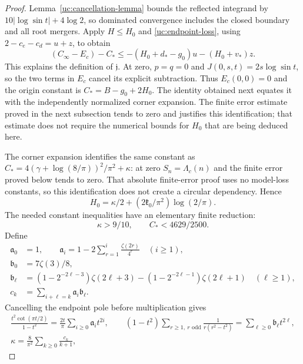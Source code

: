 \begin{proof}
Lemma~\ref{uc:cancellation-lemma} bounds the reflected integrand by
$10|\log\sin t|+4\log2$, so dominated convergence includes the
closed boundary and all root mergers. Apply $H\leq H_0$ and
\eqref{uc:endpoint-loss}, using $2-c_e-c_d=u+z$, to obtain
\[
 (C_\infty-E_c)-C_*
 \leq-(H_0+d_*-g_0)u-(H_0+v_*)z.
\]
This explains the definition of $\mathfrak{j}$. At zero, $p=q=0$ and
$J(0,s,t)=2s\log\sin t$, so the two terms in $E_c$ cancel its
explicit subtraction. Thus $E_c(0,0)=0$ and the origin constant is
$C_*=B-g_0+2H_0$. The identity obtained next equates it with the
independently normalized corner expansion. The finite error estimate
proved in the next subsection tends to zero and justifies this
identification; that estimate does not require the numerical bounds
for $H_0$ that are being deduced here.

The corner expansion identifies the same constant as
$C_*=4(\gamma+\log(8/\pi))^2/\pi^2+\kappa$:
at zero $S_n=\Lambda_c(n)$ and the finite error proved below tends
to zero. That absolute finite-error proof uses no model-loss constants,
so this identification does not create a circular dependency. Hence
\begin{equation}\label{uc:origin-identity}
 H_0=\kappa/2+(2\mathfrak{k}_0/\pi^2)\log(2/\pi).
\end{equation}
The needed constant inequalities have an elementary finite reduction:
\begin{equation}\label{uc:coarse-input}
 \kappa>9/10,\qquad C_*<4629/2500.
\end{equation}
Define
\begin{align*}
 \mathfrak a_0&=1,\qquad
 \mathfrak a_i=1-2\sum_{r=1}^i\frac{\zeta(2r)}{4^r}\quad(i\geq1),\\
 \mathfrak b_0&=7\zeta(3)/8,\\
 \mathfrak b_\ell&=(1-2^{-2\ell-3})\zeta(2\ell+3)
              -(1-2^{-2\ell-1})\zeta(2\ell+1)\quad(\ell\geq1),\\
 c_k&=\sum_{i+\ell=k}\mathfrak a_i\mathfrak b_\ell.
\end{align*}
Cancelling the endpoint pole before multiplication gives
\begin{equation}\label{uc:kappa-series}
 \begin{gathered}
 \frac{t^2\cot(\pi t/2)}{1-t^2}
       =\frac{2t}\pi\sum_{i\geq0}\mathfrak a_it^{2i},\qquad
 (1-t^2)\sum_{r\geq1,\ r\text{ odd}}
       \frac1{r(r^2-t^2)}=\sum_{\ell\geq0}\mathfrak b_\ell t^{2\ell},\\
 \kappa=\frac8{\pi^2}\sum_{k\geq0}\frac{c_k}{k+1},\qquad

\end{gathered}
\end{equation}
\end{proof}
